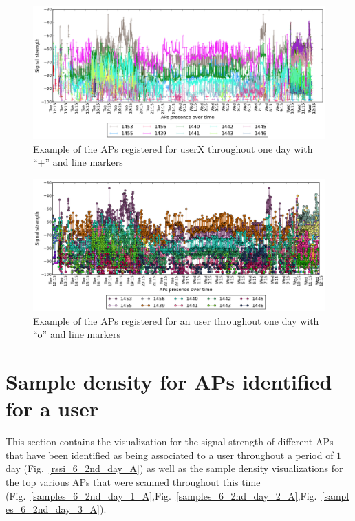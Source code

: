 \begin{figure}[!h]
\centering
\includegraphics[height =
0.45\textwidth]{figures/cros_line_user_6_sorted_1days_plot.png}
\caption{Example of the APs registered for userX throughout one day with
``+'' and line markers}
\label{user_6_cross_line_1d}
\end{figure}

\begin{figure}[!h]
\centering
\includegraphics[height =
0.45\textwidth]{figures/o_line_user_6_sorted_1days_plot.png}
\caption{Example of the APs registered for an user throughout one day with
``o'' and line markers}
\label{user_6_o_line_1d}
\end{figure}

\section{Sample density for APs identified for a user}
\label{appendix_sample_density}

This section contains the visualization for the signal strength of different APs
that have been identified as being associated to a user throughout a period of
$1$ day (Fig.~\ref{rssi_6_2nd_day_A}) as well as the sample density
visualizations for the top various APs that were scanned throughout this time
(Fig.~\ref{samples_6_2nd_day_1_A},Fig.~\ref{samples_6_2nd_day_2_A},Fig.~\ref{samples_6_2nd_day_3_A}).


